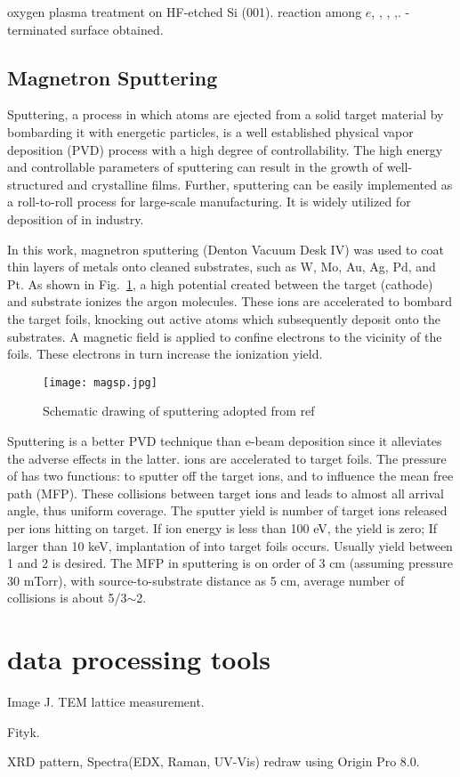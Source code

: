 oxygen plasma treatment on HF-etched Si (001). reaction among $e$, , , ,. -terminated surface obtained.\cite{Habib2010}

\subsection{Magnetron Sputtering}\label{sec:mag}

Sputtering, a process in which atoms are ejected from a solid target material by bombarding it with energetic particles, is a well established physical vapor deposition (PVD) process with a high degree of controllability. The high energy and controllable parameters of sputtering can result in the growth of well-structured and crystalline films. Further, sputtering can be easily implemented as a roll-to-roll process for large-scale manufacturing. It is widely utilized for deposition of  in industry.

In this work, magnetron sputtering (Denton Vacuum Desk IV) was used to coat thin layers of metals onto cleaned substrates, such as W, Mo, Au, Ag, Pd, and Pt. As shown in Fig.~\ref{fig:ch2magsp}, a high potential created between the target (cathode) and substrate ionizes the argon molecules. These ions are accelerated to bombard the target foils, knocking out active atoms which subsequently deposit onto the substrates. A magnetic field is applied to confine electrons to the vicinity of the foils. These electrons in turn increase the ionization yield. 

\begin{figure}[htb]
\centering
\texttt{[image: magsp.jpg]}
\caption[magnetron sputtering system]{Schematic drawing of sputtering adopted from ref\cite{Song2008}}
\label{fig:ch2magsp}
\end{figure}

Sputtering is a better PVD technique than e-beam deposition since it alleviates the adverse effects in the latter.  ions are accelerated to target foils. The pressure of  has two functions: to sputter off the target ions, and to influence the mean free path (MFP). These collisions between target ions and  leads to almost all arrival angle, thus uniform coverage. The sputter yield is number of target ions released per ions hitting on target. If  ion energy is less than 100 eV, the yield is zero; If larger than 10 keV, implantation of  into target foils occurs. Usually yield between 1 and 2 is desired. The MFP in sputtering is on order of 3 cm (assuming pressure 30 mTorr), with source-to-substrate distance as 5 cm, average number of collisions is about 5/3$\sim$2. 


\section{data processing tools}

Image J.\cite{Schneider2012} TEM lattice measurement. 

Fityk. \cite{Wojdyr2010}

XRD pattern, Spectra(EDX, Raman, UV-Vis) redraw using Origin Pro 8.0. 















